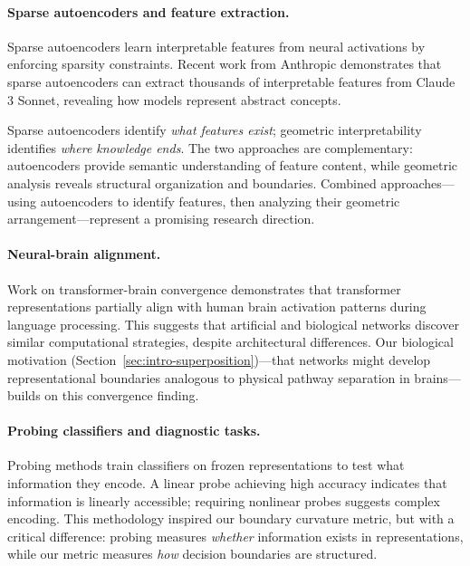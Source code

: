 \documentclass[11pt]{article}
\begin{document}
\paragraph{Sparse autoencoders and feature extraction.} Sparse autoencoders \citep{templeton2024scaling} learn interpretable features from neural activations by enforcing sparsity constraints. Recent work from Anthropic demonstrates that sparse autoencoders can extract thousands of interpretable features from Claude 3 Sonnet, revealing how models represent abstract concepts.

Sparse autoencoders identify \textit{what features exist}; geometric interpretability identifies \textit{where knowledge ends}. The two approaches are complementary: autoencoders provide semantic understanding of feature content, while geometric analysis reveals structural organization and boundaries. Combined approaches---using autoencoders to identify features, then analyzing their geometric arrangement---represent a promising research direction.

\paragraph{Neural-brain alignment.} Work on transformer-brain convergence \citep{caucheteux2022brains, schrimpf2021neural} demonstrates that transformer representations partially align with human brain activation patterns during language processing. This suggests that artificial and biological networks discover similar computational strategies, despite architectural differences. Our biological motivation (Section~\ref{sec:intro-superposition})---that networks might develop representational boundaries analogous to physical pathway separation in brains---builds on this convergence finding.


\paragraph{Probing classifiers and diagnostic tasks.}
Probing methods \citep{belinkov2017neural, conneau2018senteval} train classifiers on frozen representations to test what information they encode. A linear probe achieving high accuracy indicates that information is linearly accessible; requiring nonlinear probes suggests complex encoding. This methodology inspired our boundary curvature metric, but with a critical difference: probing measures \textit{whether} information exists in representations, while our metric measures \textit{how} decision boundaries are structured. 
\end{document}

